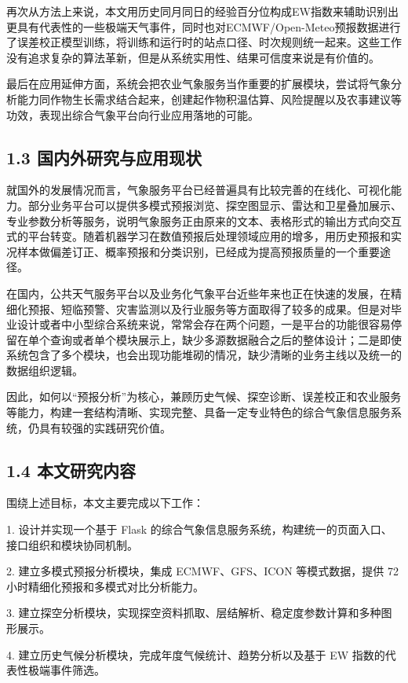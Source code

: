 再次从方法上来说，本文用历史同月同日的经验百分位构成EW指数来辅助识别出更具有代表性的一些极端天气事件，同时也对ECMWF/Open-Meteo预报数据进行了误差校正模型训练，将训练和运行时的站点口径、时次规则统一起来。这些工作没有追求复杂的算法革新，但是从系统实用性、结果可信度来说是有价值的。

最后在应用延伸方面，系统会把农业气象服务当作重要的扩展模块，尝试将气象分析能力同作物生长需求结合起来，创建起作物积温估算、风险提醒以及农事建议等功效，表现出综合气象平台向行业应用落地的可能。

\subsection{1.3 国内外研究与应用现状}

就国外的发展情况而言，气象服务平台已经普遍具有比较完善的在线化、可视化能力。部分业务平台可以提供多模式预报浏览、探空图显示、雷达和卫星叠加展示、专业参数分析等服务，说明气象服务正由原来的文本、表格形式的输出方式向交互式的平台转变。随着机器学习在数值预报后处理领域应用的增多，用历史预报和实况样本做偏差订正、概率预报和分类识别，已经成为提高预报质量的一个重要途径。

在国内，公共天气服务平台以及业务化气象平台近些年来也正在快速的发展，在精细化预报、短临预警、灾害监测以及行业服务等方面取得了较多的成果。但是对毕业设计或者中小型综合系统来说，常常会存在两个问题，一是平台的功能很容易停留在单个查询或者单个模块展示上，缺少多源数据融合之后的整体设计；二是即使系统包含了多个模块，也会出现功能堆砌的情况，缺少清晰的业务主线以及统一的数据组织逻辑。

因此，如何以“预报分析”为核心，兼顾历史气候、探空诊断、误差校正和农业服务等能力，构建一套结构清晰、实现完整、具备一定专业特色的综合气象信息服务系统，仍具有较强的实践研究价值。

\subsection{1.4 本文研究内容}

围绕上述目标，本文主要完成以下工作：

1. 设计并实现一个基于 Flask 的综合气象信息服务系统，构建统一的页面入口、接口组织和模块协同机制。

2. 建立多模式预报分析模块，集成 ECMWF、GFS、ICON 等模式数据，提供 72 小时精细化预报和多模式对比分析能力。

3. 建立探空分析模块，实现探空资料抓取、层结解析、稳定度参数计算和多种图形展示。

4. 建立历史气候分析模块，完成年度气候统计、趋势分析以及基于 EW 指数的代表性极端事件筛选。

